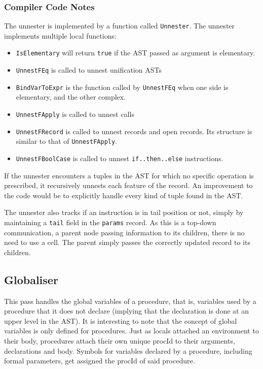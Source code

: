 \documentclass[a4paper]{memoir}
\begin{document}
\subsubsection{Compiler Code Notes}
The unnester is implemented by a function called \lstinline!Unnester!. The unnester implements multiple local functions:
\begin{itemize}
  \item  \lstinline!IsElementary! will return \lstinline!true! if the AST passed as argument is elementary.
  \item  \lstinline!UnnestFEq! is called to unnest unification ASTs
  \item  \lstinline!BindVarToExpr! is the function called by \lstinline!UnnestFEq! when one side is elementary, and the other complex.
  \item  \lstinline!UnnestFApply! is called to unnest calls
  \item  \lstinline!UnnestFRecord! is called to unnest records and open records. Its structure is similar to that of \lstinline!UnnestFApply!.
  \item  \lstinline!UnnestFBoolCase! is called to unnest \lstinline!if..then..else! instructions.
\end{itemize}
If the unnester encounters a tuples in the AST for which no specific operation is prescribed, it recursively unnests each feature of the record.
An improvement to the code would be to explicitly handle every kind of tuple
found in the AST.

The unnester also tracks if an instruction is in tail position or not, simply by
maintaining a \lstinline!tail! field in the \lstinline!params! record. As this
is a top-down communication, a parent node passing information to its children,
there is no need to use a cell. The parent simply passes the correctly updated
record to its children.

\subsection{Globaliser}\label{sec:arch:globaliser}            
This pass handles the global variables of a procedure, that is, variables used
by a procedure that it does not declare (implying that the declaration is done
at an upper level in the AST). It is interesting to note that the concept of global variables is only defined for procedures.
Just as locals attached an environment to their body, procedures attach their own unique procId to their arguments, declarations and body.
Symbols for variables declared by a procedure, including formal parameters, get assigned the procId of said procedure.
\end{document}
